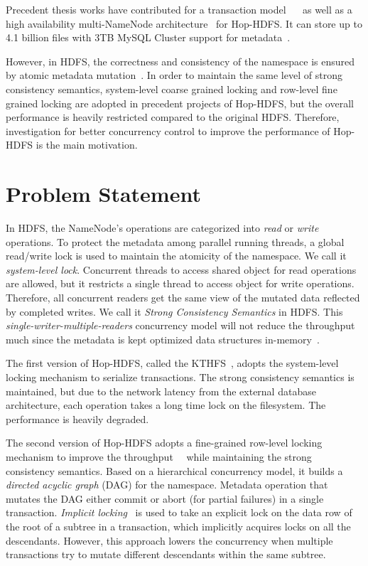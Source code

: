 \noindent Precedent thesis works have contributed for a transaction model~\cite{wasif2012distributed} ~\cite{peiro2013maintaining} as well as a high availability multi-NameNode architecture~\cite{d2013kthfs} for Hop-HDFS. It can store up to 4.1 billion files with 3TB MySQL Cluster support for metadata~\cite{hakimzadeh2014scaling}. 

\noindent However, in HDFS, the correctness and consistency of the namespace is ensured by atomic metadata mutation~\cite{shvachko2010hadoop}. In order to maintain the same level of strong consistency semantics, system-level coarse grained locking and row-level fine grained locking are adopted in precedent projects of Hop-HDFS, but the overall performance is heavily restricted compared to the original HDFS. Therefore, investigation for better concurrency control to improve the performance of Hop-HDFS is the main motivation.

\section{Problem Statement}

In HDFS, the NameNode's operations are categorized into \textit{read} or \textit{write} operations. To protect the metadata among parallel running threads, a global read/write lock is used to maintain the atomicity of the namespace. We call it \textit{system-level lock}. Concurrent threads to access shared object for read operations are allowed, but it restricts a single thread to access object for write operations. Therefore, all concurrent readers get the same view of the mutated data reflected by completed writes. We call it \textit{Strong Consistency Semantics} in HDFS. This \textit{single-writer-multiple-readers} concurrency model will not reduce the throughput much since the metadata is kept optimized data structures in-memory~\cite{hakimzadeh2014scaling}.

\noindent The first version of Hop-HDFS, called the KTHFS~\cite{wasif2012distributed}, adopts the system-level locking mechanism to serialize transactions. The strong consistency semantics is maintained, but due to the network latency from the external database architecture, each operation takes a long time lock on the filesystem. The performance is heavily degraded.

\noindent The second version of Hop-HDFS adopts a fine-grained row-level locking mechanism to improve the throughput~\cite{hakimzadeh2014scaling}~\cite{peiro2013maintaining} while maintaining the strong consistency semantics. Based on a hierarchical concurrency model, it builds a \textit{directed acyclic graph} (DAG) for the namespace. Metadata operation that mutates the DAG either commit or abort (for partial failures) in a single transaction. \textit{Implicit locking}~\cite{gray1976granularity} is used to take an explicit lock on the data row of the root of a subtree in a transaction, which implicitly acquires locks on all the descendants. However, this approach lowers the concurrency when multiple transactions try to mutate different descendants within the same subtree.

